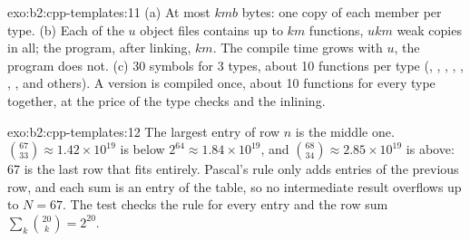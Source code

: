 \begin{solution}{exo:b2:cpp-templates:11}
(a) At most $kmb$ bytes: one copy of each member per type. (b) Each of the $u$ object files contains up to $km$
functions, $ukm$ weak copies in all; the program, after linking, $km$. The compile time grows with $u$, the program
does not. (c) 30 symbols for 3 types, about 10 functions per type (, , ,
, , , ,  and others). A  version is
compiled once, about 10 functions for every type together, at the price of the type checks and the inlining.
\end{solution}

\begin{solution}{exo:b2:cpp-templates:12}
The largest entry of row $n$ is the middle one. $\binom{67}{33} \approx 1.42 \times 10^{19}$ is below $2^{64} \approx
1.84 \times 10^{19}$, and $\binom{68}{34} \approx 2.85 \times 10^{19}$ is above: 67 is the last row that fits entirely.
Pascal's rule only adds entries of the previous row, and each sum is an entry of the table, so no intermediate
result overflows up to $N = 67$. The test checks the rule for every entry and the row sum
$\sum_k \binom{20}{k} = 2^{20}$.
\end{solution}

